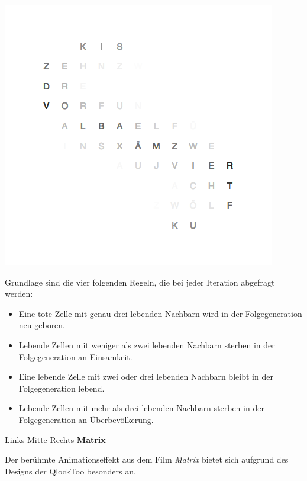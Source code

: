 \begin{multicols}{2}
{
    \centering
    \includegraphics[width=\columnwidth]{Abbildungen/Software/Demo/Helix}
}

Grundlage sind die vier folgenden Regeln, die bei jeder Iteration abgefragt werden:
\begin{itemize}
\item Eine tote Zelle mit genau drei lebenden Nachbarn wird in der Folgegeneration neu geboren.
\item Lebende Zellen mit weniger als zwei lebenden Nachbarn sterben in der Folgegeneration an Einsamkeit.
\item Eine lebende Zelle mit zwei oder drei lebenden Nachbarn bleibt in der Folgegeneration lebend.
\item Lebende Zellen mit mehr als drei lebenden Nachbarn sterben in der Folgegeneration an Überbevölkerung.
\end{itemize}

\begin{tabbing}
 Links \= Mitte \= Rechts \kill
 \> \textbf{Matrix}
\end{tabbing}

Der berühmte Animationseffekt aus dem Film \emph{Matrix} bietet sich aufgrund des Designs der QlockToo besonders an.


\end{multicols}
